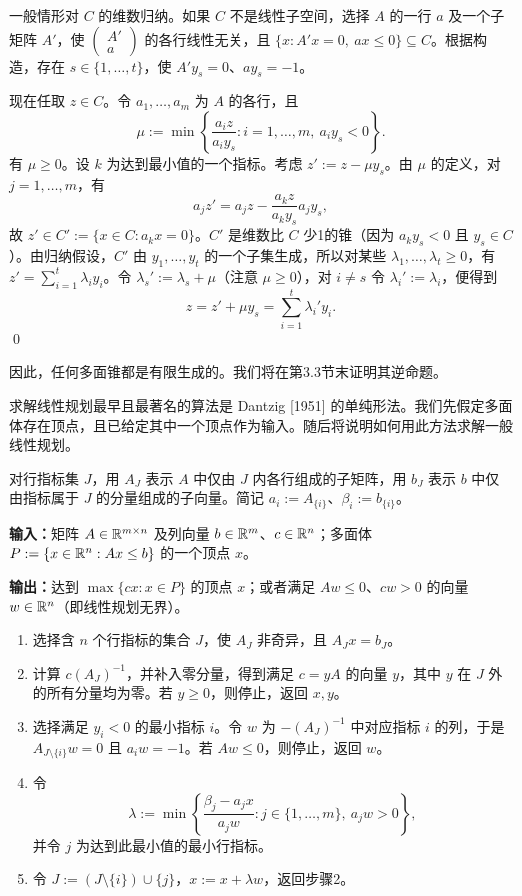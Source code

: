 一般情形对 $C$ 的维数归纳。如果 $C$ 不是线性子空间，选择 $A$ 的一行 $a$ 及一个子矩阵 $A'$，使 $\begin{pmatrix}A'\\a\end{pmatrix}$ 的各行线性无关，且 $\{x:A'x=0,\ ax\le0\}\subseteq C$。根据构造，存在 $s\in\{1,\ldots,t\}$，使 $A'y_s=0$、$ay_s=-1$。

现在任取 $z\in C$。令 $a_1,\ldots,a_m$ 为 $A$ 的各行，且
\[
\mu:=\min\left\{\frac{a_i z}{a_i y_s}:i=1,\ldots,m,\ a_i y_s<0\right\}.
\]
有 $\mu\ge0$。设 $k$ 为达到最小值的一个指标。考虑 $z':=z-\mu y_s$。由 $\mu$ 的定义，对 $j=1,\ldots,m$，有
\[
a_jz'=a_jz-\frac{a_kz}{a_ky_s}a_jy_s,
\]
故 $z'\in C':=\{x\in C:a_kx=0\}$。$C'$ 是维数比 $C$ 少1的锥（因为 $a_ky_s<0$ 且 $y_s\in C$）。由归纳假设，$C'$ 由 $y_1,\ldots,y_t$ 的一个子集生成，所以对某些 $\lambda_1,\ldots,\lambda_t\ge0$，有 $z'=\sum_{i=1}^t\lambda_i y_i$。令 $\lambda_s':=\lambda_s+\mu$（注意 $\mu\ge0$），对 $i\ne s$ 令 $\lambda_i':=\lambda_i$，便得到
\[
z=z'+\mu y_s=\sum_{i=1}^t\lambda_i' y_i.
\]\qed

因此，任何多面锥都是有限生成的。我们将在第3.3节末证明其逆命题。

求解线性规划最早且最著名的算法是 Dantzig [1951] 的单纯形法。我们先假定多面体存在顶点，且已给定其中一个顶点作为输入。随后将说明如何用此方法求解一般线性规划。

对行指标集 $J$，用 $A_J$ 表示 $A$ 中仅由 $J$ 内各行组成的子矩阵，用 $b_J$ 表示 $b$ 中仅由指标属于 $J$ 的分量组成的子向量。简记 $a_i:=A_{\{i\}}$、$\beta_i:=b_{\{i\}}$。

\textbf{输入：}矩阵 $A\in\mathbb R^{m\times n}$ 及列向量 $b\in\mathbb R^m$、$c\in\mathbb R^n$；多面体 $P:=\{x\in\mathbb R^n:Ax\le b\}$ 的一个顶点 $x$。\par
\textbf{输出：}达到 $\max\{cx:x\in P\}$ 的顶点 $x$；或者满足 $Aw\le0$、$cw>0$ 的向量 $w\in\mathbb R^n$（即线性规划无界）。
\begin{enumerate}[label=\arabic*.]
\item 选择含 $n$ 个行指标的集合 $J$，使 $A_J$ 非奇异，且 $A_Jx=b_J$。
\item 计算 $c(A_J)^{-1}$，并补入零分量，得到满足 $c=yA$ 的向量 $y$，其中 $y$ 在 $J$ 外的所有分量均为零。若 $y\ge0$，则停止，返回 $x,y$。
\item 选择满足 $y_i<0$ 的最小指标 $i$。令 $w$ 为 $-(A_J)^{-1}$ 中对应指标 $i$ 的列，于是 $A_{J\setminus\{i\}}w=0$ 且 $a_iw=-1$。若 $Aw\le0$，则停止，返回 $w$。
\item 令
\[
\lambda:=\min\left\{\frac{\beta_j-a_jx}{a_jw}:j\in\{1,\ldots,m\},\ a_jw>0\right\},
\]
并令 $j$ 为达到此最小值的最小行指标。
\item 令 $J:=(J\setminus\{i\})\cup\{j\}$，$x:=x+\lambda w$，返回步骤2。
\end{enumerate}

